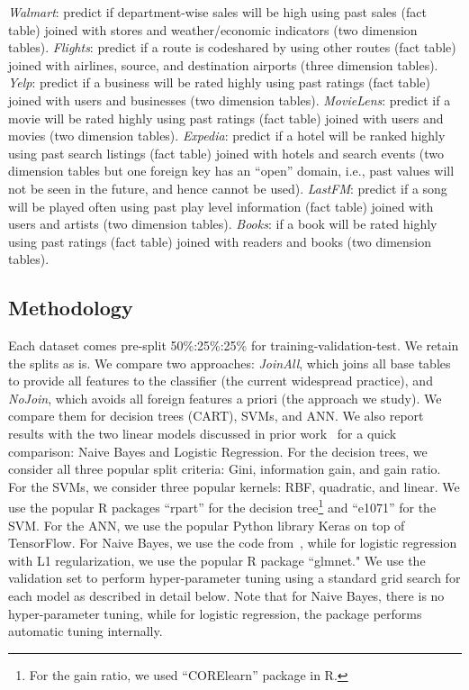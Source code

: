 \documentclass{vldb}
\begin{document}
\textit{Walmart}: predict if department-wise sales will be high using past sales (fact table) joined with stores and weather/economic indicators (two dimension tables).
\textit{Flights}: predict if a route is codeshared by using other routes (fact table) joined with airlines, source, and destination airports (three dimension tables).
\textit{Yelp}: predict if a business will be rated highly using past ratings (fact table) joined with users and businesses (two dimension tables).
\textit{MovieLens}: predict if a movie will be rated highly using past ratings (fact table) joined with users and movies (two dimension tables).
\textit{Expedia}: predict if a hotel will be ranked highly using past search listings (fact table) joined with hotels and search events (two dimension tables but one foreign key has an 
``open'' domain, i.e., past values will not be seen in the future, and hence cannot be used).
\textit{LastFM}: predict if a song will be played often using past play level information (fact table) joined with users and artists (two dimension tables).
\textit{Books}: if a book will be rated highly using past ratings (fact table) joined with readers and books (two dimension tables).

\subsection{Methodology}
Each dataset comes pre-split 50\%:25\%:25\% for training-validation-test. We retain the splits as is.
We compare two approaches: \textit{JoinAll}, which joins all base tables to provide all features to the classifier (the current widespread practice), and \textit{NoJoin},
which avoids all foreign features a priori (the approach we study). We compare them for decision trees (CART), SVMs, and ANN. We also report results with the two 
linear models discussed in prior work~\cite{hamlet} for a quick comparison: Naive Bayes and Logistic Regression.
For the decision trees, we consider all three popular split criteria: Gini, information gain, and gain ratio.
For the SVMs, we consider three popular kernels: RBF, quadratic, and linear.
We use the popular R packages ``rpart'' for the decision tree\footnote{For the gain 
ratio, we used ``CORElearn'' package in R.} and ``e1071'' for the SVM.  For the ANN, we use the popular Python library Keras on top of TensorFlow.
For Naive Bayes, we use the code from~\cite{hamlet}, while for logistic regression with L1 regularization, we use the popular R package ``glmnet."
We use the validation set to perform hyper-parameter tuning using a standard grid search for each model as described in detail below. Note that 
for Naive Bayes, there is no hyper-parameter tuning, while for logistic regression, the package performs automatic tuning internally.
\end{document}
